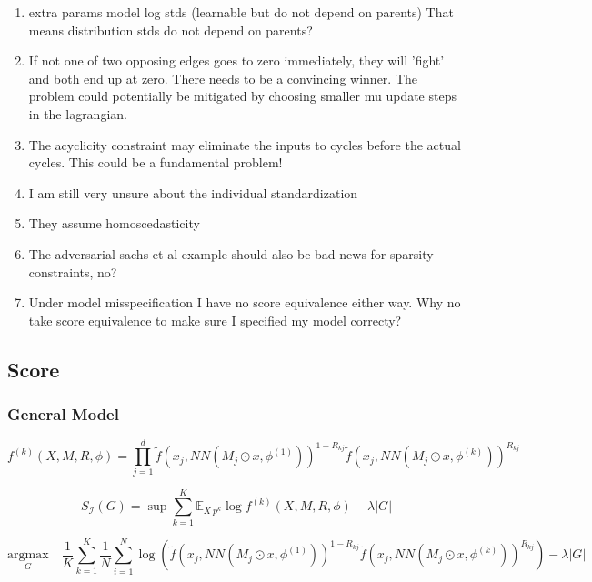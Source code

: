 \documentclass{article}
\begin{document}
\begin{enumerate}
    \item extra params model log stds (learnable but do not depend on parents) That means distribution stds do not depend on parents?
    \item If not one of two opposing edges goes to zero immediately, they will 'fight' and both end up at zero. There needs to be a convincing winner. The problem could potentially be mitigated by choosing smaller mu update steps in the lagrangian.
    \item The acyclicity constraint may eliminate the inputs to cycles before the actual cycles. This could be a fundamental problem!
    \item I am still very unsure about the individual standardization
    \item They assume homoscedasticity
    \item The adversarial sachs et al example should also be bad news for sparsity constraints, no?
    \item Under model misspecification I have no score equivalence either way. Why no take score equivalence to make sure I specified my model correcty?
\end{enumerate}

\subsection{Score}

    

\subsubsection{General Model}
\begin{equation}
    f^{(k)}(X, M, R, \phi) = \prod_{j=1}^{d} \tilde{f}(x_j, NN(M_j \odot x, \phi^{(1)}))^{1-R_{kj}} \tilde{f}(x_j, NN(M_j \odot x, \phi^{(k)}))^{R_{kj}}
\end{equation}

\begin{equation}
    S_{\mathcal{I}}(G) = \sup \sum_{k=1}^K \mathbb{E}_{X ~ p^{k}} \log f^{(k)}(X, M, R, \phi) - \lambda |G|
\end{equation}

\begin{equation}
    \underset{G}{\mathrm{argmax}} \quad \frac{1}{K} \sum_{k=1}^K \frac{1}{N} \sum_{i=1}^N \log(\tilde{f}(x_j, NN(M_j \odot x, \phi^{(1)}))^{1-R_{kj}} \tilde{f}(x_j, NN(M_j \odot x, \phi^{(k)}))^{R_{kj}}) - \lambda |G|
\end{equation}
\end{document}
